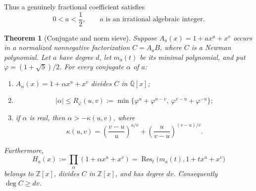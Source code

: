 \documentclass[11pt]{article}
\newtheorem{theorem}{Theorem}[section]
\theoremstyle{remark}
\newcommand{\Q}{\mathbb Q}
\newcommand{\Z}{\mathbb Z}
\newcommand{\ph}{\varphi}
\DeclareMathOperator{\Res}{Res}
\numberwithin{equation}{section}
\begin{document}
Thus a genuinely fractional coefficient satisfies
\begin{equation}\label{eq:fractional}
 0<a<\frac12,\qquad a\text{ is an irrational algebraic integer}.
\end{equation}

\begin{theorem}[Conjugate and norm sieve]\label{thm:norm}
Suppose $A_a(x)=1+a x^u+x^v$ occurs in a normalized nonnegative factorization
$C=A_aB$, where $C$ is a Newman polynomial.  Let $a$ have degree $d$, let
$m_a(t)$ be its minimal polynomial, and put $\ph=(1+\sqrt5)/2$.  For every
conjugate $\alpha$ of $a$:
\begin{enumerate}[label=(\alph*)]
\item $A_\alpha(x)=1+\alpha x^u+x^v$ divides $C$ in $\overline{\Q}[x]$;
\item
\begin{equation}\label{eq:Rphi}
 |\alpha|\le R_\ph(u,v):=
 \min\{\ph^u+\ph^{u-v},\ \ph^{v-u}+\ph^{-u}\};
\end{equation}
\item if $\alpha$ is real, then $\alpha>-\kappa(u,v)$, where
\begin{equation}\label{eq:kappa}
 \kappa(u,v)=
 \left(\frac{v-u}{u}\right)^{u/v}
 +\left(\frac{u}{v-u}\right)^{(v-u)/v}.
\end{equation}
\end{enumerate}
Furthermore,
\begin{equation}\label{eq:norm}
 H_a(x):=\prod_\alpha(1+\alpha x^u+x^v)
 =\Res_t\bigl(m_a(t),1+t x^u+x^v\bigr)
\end{equation}
belongs to $\Z[x]$, divides $C$ in $\Z[x]$, and has degree $dv$.
Consequently $\deg C\ge dv$.
\end{theorem}
\end{document}
